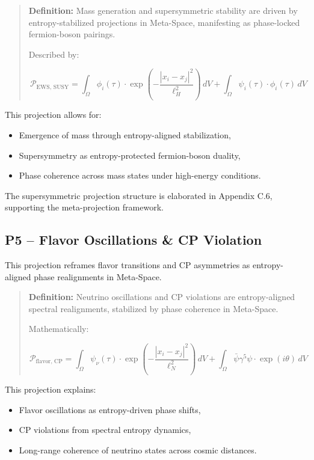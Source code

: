 \documentclass[10.5pt,a4paper]{article}
\begin{document}
\begin{quote}
\textbf{Definition:}  
Mass generation and supersymmetric stability are driven by entropy-stabilized projections in Meta-Space, 
manifesting as phase-locked fermion-boson pairings.

Described by:

\[
\mathcal{P}_{\text{EWS, SUSY}} = \int_\Omega \phi_i(\tau) \cdot \exp\left(-\frac{|x_i - x_j|^2}{\ell_H^2}\right) \, dV 
+ \int_\Omega \psi_i(\tau) \cdot \phi_i(\tau) \, dV
\]
\end{quote}

This projection allows for:
\begin{itemize}
    \item Emergence of mass through entropy-aligned stabilization,
    \item Supersymmetry as entropy-protected fermion-boson duality,
    \item Phase coherence across mass states under high-energy conditions.
\end{itemize}

The supersymmetric projection structure is elaborated in Appendix C.6, supporting the meta-projection framework.

\subsection{P5 – Flavor Oscillations \& CP Violation}

This projection reframes flavor transitions and CP asymmetries as entropy-aligned phase realignments in Meta-Space.

\begin{quote}
\textbf{Definition:}  
Neutrino oscillations and CP violations are entropy-aligned spectral realignments, stabilized by phase coherence in Meta-Space.

Mathematically:

\[
\mathcal{P}_{\text{flavor, CP}} = \int_\Omega \psi_\nu(\tau) \cdot \exp\left(-\frac{|x_i - x_j|^2}{\ell_N^2}\right) \, dV 
+ \int_\Omega \bar{\psi} \gamma^5 \psi \cdot \exp(i\theta) \, dV
\]
\end{quote}

This projection explains:
\begin{itemize}
    \item Flavor oscillations as entropy-driven phase shifts,
    \item CP violations from spectral entropy dynamics,
    \item Long-range coherence of neutrino states across cosmic distances.
\end{itemize}
\end{document}
